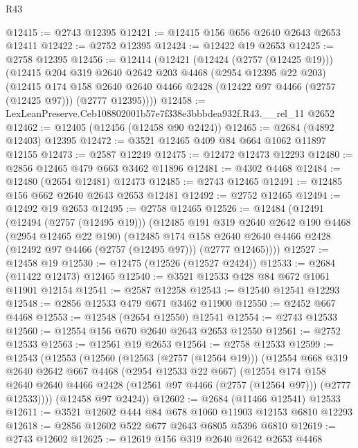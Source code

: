\begin{lexlean}{R43}
\begin{coremodule}
@12415 := @2743 @12395
@12421 := @12415 @156 @656 @2640 @2643 @2653 @12411
@12422 := @2752 @12395
@12424 := @12422 @19 @2653
@12425 := @2758 @12395
@12456 := @12414
    (@12421
      (@12424 (@2757 (@12425 @19)))
      (@12415
        @204
        @319
        @2640
        @2642
        @203
        @4468
        (@2954 @12395 @22 @203)
        (@12415
          @174
          @158
          @2640
          @2640
          @4466
          @2428
          (@12422 @97 @4466 (@2757 (@12425 @97)))
          (@2777 @12395))))
@12458 := LexLeanPreserve.Ceb108802001b57e7f338e3bbbdea932f.R43.__rel_11 @2652
@12462 := @12405 (@12456 (@12458 @90 @2424))
@12465 := @2684 (@4892 @12403) @12395
@12472 := @3521 @12465 @409 @84 @664 @1062 @11897 @12155
@12473 := @2587 @12249
@12475 := @12472 @12473 @12293
@12480 := @2856 @12465 @479 @663 @3462 @11896
@12481 := @4302 @4468
@12484 := @12480 (@2654 @12481) @12473
@12485 := @2743 @12465
@12491 := @12485 @156 @662 @2640 @2643 @2653 @12481
@12492 := @2752 @12465
@12494 := @12492 @19 @2653
@12495 := @2758 @12465
@12526 := @12484
    (@12491
      (@12494 (@2757 (@12495 @19)))
      (@12485
        @191
        @319
        @2640
        @2642
        @190
        @4468
        (@2954 @12465 @22 @190)
        (@12485
          @174
          @158
          @2640
          @2640
          @4466
          @2428
          (@12492 @97 @4466 (@2757 (@12495 @97)))
          (@2777 @12465))))
@12527 := @12458 @19
@12530 := @12475 (@12526 (@12527 @2424))
@12533 := @2684 (@11422 @12473) @12465
@12540 := @3521 @12533 @428 @84 @672 @1061 @11901 @12154
@12541 := @2587 @12258
@12543 := @12540 @12541 @12293
@12548 := @2856 @12533 @479 @671 @3462 @11900
@12550 := @2452 @667 @4468
@12553 := @12548 (@2654 @12550) @12541
@12554 := @2743 @12533
@12560 := @12554 @156 @670 @2640 @2643 @2653 @12550
@12561 := @2752 @12533
@12563 := @12561 @19 @2653
@12564 := @2758 @12533
@12599 := @12543
    (@12553
      (@12560
        (@12563 (@2757 (@12564 @19)))
        (@12554
          @668
          @319
          @2640
          @2642
          @667
          @4468
          (@2954 @12533 @22 @667)
          (@12554
            @174
            @158
            @2640
            @2640
            @4466
            @2428
            (@12561 @97 @4466 (@2757 (@12564 @97)))
            (@2777 @12533))))
      (@12458 @97 @2424))
@12602 := @2684 (@11466 @12541) @12533
@12611 := @3521 @12602 @444 @84 @678 @1060 @11903 @12153 @6810 @12293
@12618 := @2856 @12602 @522 @677 @2643 @6805 @5396 @6810
@12619 := @2743 @12602
@12625 := @12619 @156 @319 @2640 @2642 @2653 @4468

\end{coremodule}
\end{lexlean}
